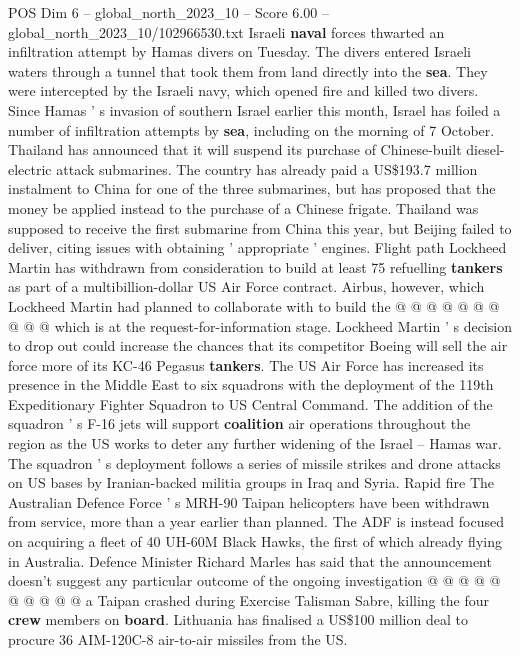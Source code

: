 \begin{textsample}{POS Dim 6 – global\_north\_2023\_10 – Score 6.00 – global\_north\_2023\_10/102966530.txt}  \label{ex:f6_pos_203}
Israeli \textbf{naval} forces thwarted an infiltration attempt by Hamas divers on Tuesday.
The divers entered Israeli waters through a tunnel that took them from land directly into the \textbf{sea}.
They were intercepted by the Israeli navy, which opened fire and killed two divers.
Since Hamas ' s invasion of southern Israel earlier this month, Israel has foiled a number of infiltration attempts by \textbf{sea}, including on the morning of 7 October.
Thailand has announced that it will suspend its purchase of Chinese-built diesel-electric attack submarines.
The country has already paid a US\$193.7 million instalment to China for one of the three submarines, but has proposed that the money be applied instead to the purchase of a Chinese frigate.
Thailand was supposed to receive the first submarine from China this year, but Beijing failed to deliver, citing issues with obtaining ' appropriate ' engines.
Flight path Lockheed Martin has withdrawn from consideration to build at least 75 refuelling \textbf{tankers} as part of a multibillion-dollar US Air Force contract.
Airbus, however, which Lockheed Martin had planned to collaborate with to build the @ @ @ @ @ @ @ @ @ @ which is at the request-for-information stage.
Lockheed Martin ' s decision to drop out could increase the chances that its competitor Boeing will sell the air force more of its KC-46 Pegasus \textbf{tankers}.
The US Air Force has increased its presence in the Middle East to six squadrons with the deployment of the 119th Expeditionary Fighter Squadron to US Central Command.
The addition of the squadron ' s F-16 jets will support \textbf{coalition} air operations throughout the region as the US works to deter any further widening of the Israel -- Hamas war.
The squadron ' s deployment follows a series of missile strikes and drone attacks on US bases by Iranian-backed militia groups in Iraq and Syria.
Rapid fire The Australian Defence Force ' s MRH-90 Taipan helicopters have been withdrawn from service, more than a year earlier than planned.
The ADF is instead focused on acquiring a fleet of 40 UH-60M Black Hawks, the first of which already flying in Australia.
Defence Minister Richard Marles has said that the announcement doesn't suggest any particular outcome of the ongoing investigation @ @ @ @ @ @ @ @ @ @ a Taipan crashed during Exercise Talisman Sabre, killing the four \textbf{crew} members on \textbf{board}.
Lithuania has finalised a US\$100 million deal to procure 36 AIM-120C-8 air-to-air missiles from the US.

\end{textsample}

